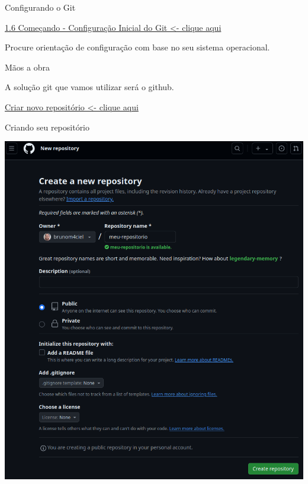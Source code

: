 \begin{frame}[t]{Configurando o Git}
	
	\vspace{0.5em}
	
	\href{https://git-scm.com/book/pt-br/v2/Come\%C3\%A7ando-Configura\%C3\%A7\%C3\%A3o-Inicial-do-Git}{1.6 Começando - Configuração Inicial do Git <- clique aqui}
	
	\vspace{0.5em}
	Procure orientação de configuração com base no seu sistema operacional.
	
\end{frame}




\begin{frame}[t]{Mãos a obra}
	
	\vspace{0.5em}
	
	A solução git que vamos utilizar será o github.
	
	\vspace{1em}
	
	\href{https://github.com/new}{Criar novo repositório <- clique aqui}
	
\end{frame}


\begin{frame}[t]{Criando seu repositório}

	\centering
	\includegraphics[scale=0.20]{imagens/fig-github-new.png}

\end{frame}



